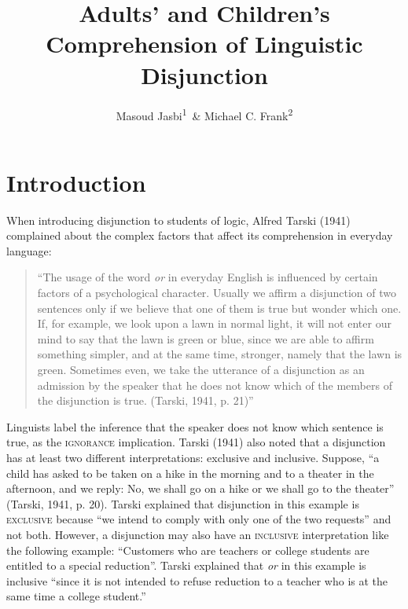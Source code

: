 \documentclass[,man,floatsintext]{apa6}
\title{Adults' and Children's Comprehension of Linguistic Disjunction}
\author{Masoud Jasbi\textsuperscript{1}~\& Michael C. Frank\textsuperscript{2}}
\date{}
\affiliation{
\vspace{0.5cm}
\textsuperscript{1} Harvard University\\\textsuperscript{2} Stanford University}
\begin{document}
\maketitle

\hypertarget{introduction}{%
\section{Introduction}\label{introduction}}

When introducing disjunction to students of logic, Alfred Tarski (1941) complained about the complex factors that affect its comprehension in everyday language:

\begin{quote}
\enquote{The usage of the word \emph{or} in everyday English is influenced by certain factors of a psychological character. Usually we affirm a disjunction of two sentences only if we believe that one of them is true but wonder which one. If, for example, we look upon a lawn in normal light, it will not enter our mind to say that the lawn is green or blue, since we are able to affirm something simpler, and at the same time, stronger, namely that the lawn is green. Sometimes even, we take the utterance of a disjunction as an admission by the speaker that he does not know which of the members of the disjunction is true. (Tarski, 1941, p. 21)}
\end{quote}

Linguists label the inference that the speaker does not know which sentence is true, as the \textsc{ignorance} implication. Tarski (1941) also noted that a disjunction has at least two different interpretations: exclusive and inclusive. Suppose, \enquote{a child has asked to be taken on a hike in the morning and to a theater in the afternoon, and we reply: No, we shall go on a hike or we shall go to the theater} (Tarski, 1941, p. 20). Tarski explained that disjunction in this example is \textsc{exclusive} because \enquote{we intend to comply with only one of the two requests} and not both. However, a disjunction may also have an \textsc{inclusive} interpretation like the following example: \enquote{Customers who are teachers or college students are entitled to a special reduction}. Tarski explained that \emph{or} in this example is inclusive \enquote{since it is not intended to refuse reduction to a teacher who is at the same time a college student.}
\end{document}
